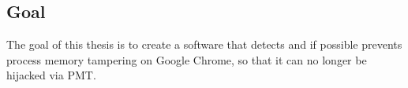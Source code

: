 \subsection{Goal}
The goal of this thesis is to create a software that detects and if possible prevents process memory tampering on Google Chrome, so that it can no longer be hijacked via \gls{PMT}.